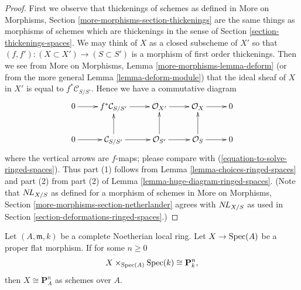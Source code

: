 \begin{proof}
First we observe that thickenings of schemes as defined in
More on Morphisms, Section \ref{more-morphisms-section-thickenings}
are the same things as morphisms of schemes which
are thickenings in the sense of
Section \ref{section-thickenings-spaces}.
We may think of $X$ as a closed subscheme of $X'$
so that $(f, f') : (X \subset X') \to (S \subset S')$
is a morphism of first order thickenings. Then we see
from More on Morphisms, Lemma \ref{more-morphisms-lemma-deform}
(or from the more general Lemma \ref{lemma-deform-module})
that the ideal sheaf of $X$ in $X'$ is equal to $f^*\mathcal{C}_{S/S'}$.
Hence we have a commutative diagram
$$
\xymatrix{
0 \ar[r] & f^*\mathcal{C}_{S/S'} \ar[r] &
\mathcal{O}_{X'} \ar[r] &
\mathcal{O}_X \ar[r] & 0 \\
0 \ar[r] & \mathcal{C}_{S/S'} \ar[u] \ar[r] &
\mathcal{O}_{S'} \ar[u] \ar[r] &
\mathcal{O}_S \ar[u] \ar[r] & 0
}
$$
where the vertical arrows are $f$-maps; please compare with
(\ref{equation-to-solve-ringed-spaces}).
Thus part (1) follows from
Lemma \ref{lemma-choices-ringed-spaces}
and part (2) from part (2) of
Lemma \ref{lemma-huge-diagram-ringed-spaces}.
(Note that $\mathop{N\!L}\nolimits_{X/S}$ as defined for a morphism of schemes in
More on Morphisms, Section \ref{more-morphisms-section-netherlander}
agrees with $\mathop{N\!L}\nolimits_{X/S}$ as used in
Section \ref{section-deformations-ringed-spaces}.)
\end{proof}

\begin{lemma}
\label{lemma-projective-space-rigid-complete-local}
\begin{reference}
\cite[Expos\'e 182, Corollaire 2, p. 206]{FGA}
\end{reference}
Let $(A, \mathfrak m, k)$ be a complete Noetherian local ring.
Let $X \to \mathop{\mathrm{Spec}}(A)$ be a proper flat morphism. If for some $n \geq 0$
$$
X \times_{\mathop{\mathrm{Spec}}(A)} \mathop{\mathrm{Spec}}(k) \cong \mathbf{P}^n_k,
$$
then $X \cong \mathbf{P}^n_A$ as schemes over $A$.
\end{lemma}

